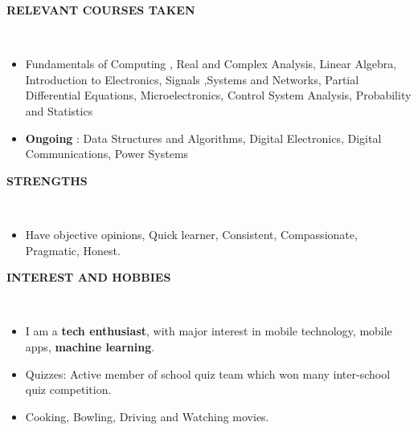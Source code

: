 \documentclass[a4paper,10pt]{article}
\newcommand{\isep}{-2 pt}
\newcommand{\lsep}{-0.5cm}
\newcommand{\resheading}[1]{{\small \colorbox{mygrey}{\begin{minipage}{0.975\textwidth}{\textbf{#1 \vphantom{p\^{E}}}}\end{minipage}}}}
\begin{document}
\resheading{\textbf{RELEVANT COURSES TAKEN} }\\[\lsep]
\begin{itemize}
\item Fundamentals of Computing , Real and Complex Analysis, Linear Algebra, Introduction to Electronics, Signals ,Systems and Networks, Partial Differential Equations, Microelectronics, Control System Analysis, Probability and Statistics

\item \textbf{Ongoing} : Data Structures and Algorithms, Digital Electronics, Digital Communications, Power Systems



\end{itemize}



\resheading{\textbf{STRENGTHS} }\\[\lsep]
\begin{itemize}
\item \noindent Have objective opinions, Quick learner, Consistent, Compassionate, Pragmatic, Honest.
\end{itemize}




\resheading{\textbf{INTEREST AND HOBBIES} }\\[\lsep]
\begin{itemize}\itemsep\isep
\item \noindent I am a \textbf{tech enthusiast}, with major interest in mobile technology, mobile apps, \textbf{machine learning}.

\item \noindent Quizzes: Active member of school quiz team which won many inter-school quiz competition.

\item \noindent Cooking, Bowling, Driving and Watching movies.

\end{itemize}
\end{document}
